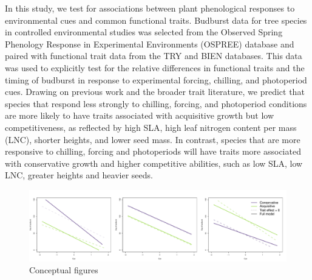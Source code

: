\documentclass{article}\usepackage[]{graphicx}\usepackage[]{color}
\begin{document}
In this study, we test for associations between plant phenological responses to environmental cues and common functional traits. Budburst data for tree species in controlled environmental studies was selected from the Observed Spring Phenology Response in Experimental Environments (OSPREE) database and paired with functional trait data from the TRY and BIEN databases. This data was used to explicitly test for the relative differences in functional traits and the timing of budburst in response to experimental forcing, chilling, and photoperiod cues. Drawing on previous work and the broader trait literature, we predict that species that respond less strongly to chilling, forcing, and photoperiod conditions are more likely to have traits associated with acquisitive growth but low competitiveness, as reflected by high SLA, high leaf nitrogen content per mass (LNC), shorter heights, and lower seed mass. In contrast, species that are more responsive to chilling, forcing and photoperiods will have traits more associated with conservative growth and higher competitive abilities, such as low SLA, low LNC, greater heights and heavier seeds. 


\begin{figure}[h!]
    \centering
 \includegraphics[width=\textwidth]{..//..//analyses/traits/figures/conceptFig.pdf} 
    \caption{Conceptual figures}
    \label{fig:config}
\end{figure}
\end{document}
